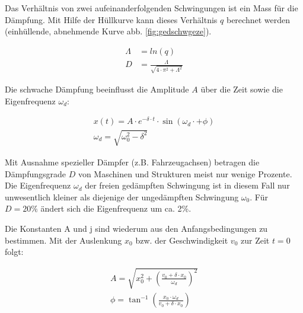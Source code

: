 Das Verhältnis von zwei aufeinanderfolgenden Schwingungen ist ein Mass
für die Dämpfung. Mit Hilfe der Hüllkurve kann dieses Verhältnis $q$ 
berechnet werden (einhüllende, abnehmende Kurve abb. \ref{fig:gedschwgeze}).

\begin{equbox}
    \begin{align}
        \Lambda &= ln(q) \\
        D &= \frac{\Lambda}{\sqrt{4 \cdot \pi^2 + \Lambda^2}}
    \end{align}
\end{equbox}

Die schwache Dämpfung beeinflusst die Amplitude $A$ über die Zeit sowie die Eigenfrequenz $\omega_d$:

\begin{equbox}
    \begin{align}
        x(t) = A \cdot e^{- \delta \cdot t} \cdot \sin(\omega_d \cdot + \phi) \\
        \omega_d = \sqrt{\omega_0^2 - \delta^2}
    \end{align}
\end{equbox}

Mit Ausnahme spezieller Dämpfer (z.B. Fahrzeugachsen) betragen die Dämpfungsgrade $D$
von Maschinen und Strukturen meist nur wenige Prozente. Die Eigenfrequenz $\omega_d$ der freien
gedämpften Schwingung ist in diesem Fall nur unwesentlich kleiner als diejenige der
ungedämpften Schwingung $\omega_0$. Für $D = 20\%$ ändert sich die Eigenfrequenz um ca. 2\%.

Die Konstanten A und j sind wiederum aus den Anfangsbedingungen zu bestimmen.
Mit der Auslenkung $x_0$ bzw. der Geschwindigkeit $v_0$ zur Zeit $t = 0$ folgt:

\begin{equbox}
    \begin{align}
        A = \sqrt{x_0^2 + (\frac{v_0 + \delta \cdot x_0}{\omega_d})^2} \\
        \phi = \tan^{-1}(\frac{x_0 \cdot \omega_d}{v_0 + \delta \cdot x_0})
    \end{align}
\end{equbox}

